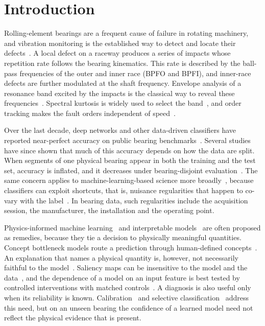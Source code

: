 \documentclass[10pt,letterpaper]{article}
\begin{document}
\section*{Introduction}
Rolling-element bearings are a frequent cause of failure in rotating machinery, and vibration monitoring is the established way to detect and locate their defects~\cite{randall2011rolling,lei2020applications}. A local defect on a raceway produces a series of impacts whose repetition rate follows the bearing kinematics. This rate is described by the ball-pass frequencies of the outer and inner race (BPFO and BPFI), and inner-race defects are further modulated at the shaft frequency. Envelope analysis of a resonance band excited by the impacts is the classical way to reveal these frequencies~\cite{randall2011rolling,ho2000optimisation}. Spectral kurtosis is widely used to select the band~\cite{antoni2006spectral,antoni2007fast}, and order tracking makes the fault orders independent of speed~\cite{fyfe1997analysis}.

Over the last decade, deep networks and other data-driven classifiers have reported near-perfect accuracy on public bearing benchmarks~\cite{zhang2020deep,lei2020applications}. Several studies have since shown that much of this accuracy depends on how the data are split. When segments of one physical bearing appear in both the training and the test set, accuracy is inflated, and it decreases under bearing-disjoint evaluation~\cite{hendriks2022towards,wheat2024impact,vieira2026towards}. The same concern applies to machine-learning-based science more broadly~\cite{kapoor2023leakage}, because classifiers can exploit shortcuts, that is, nuisance regularities that happen to co-vary with the label~\cite{geirhos2020shortcut}. In bearing data, such regularities include the acquisition session, the manufacturer, the installation and the operating point.

Physics-informed machine learning~\cite{karniadakis2021physics} and interpretable models~\cite{rudin2019stop} are often proposed as remedies, because they tie a decision to physically meaningful quantities. Concept bottleneck models route a prediction through human-defined concepts~\cite{koh2020concept}. An explanation that names a physical quantity is, however, not necessarily faithful to the model~\cite{jacovi2020towards}. Saliency maps can be insensitive to the model and the data~\cite{adebayo2018sanity}, and the dependence of a model on an input feature is best tested by controlled interventions with matched controls~\cite{hooker2019benchmark}. A diagnosis is also useful only when its reliability is known. Calibration~\cite{guo2017calibration} and selective classification~\cite{geifman2017selective} address this need, but on an unseen bearing the confidence of a learned model need not reflect the physical evidence that is present.
\end{document}
